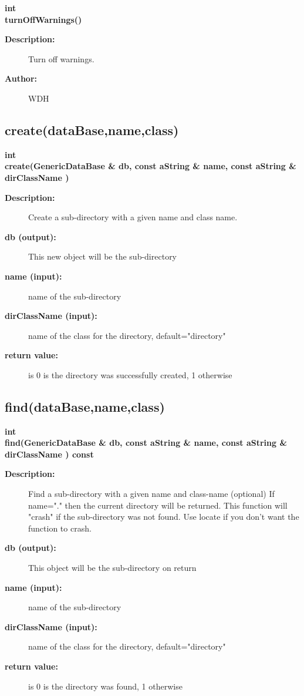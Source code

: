 \begin{flushleft} \textbf{%
int  \\ 
\settowidth{\GenericDataBaseIncludeArgIndent}{turnOffWarnings(}%
turnOffWarnings()
}\end{flushleft}
\begin{description}
\item[{\bf Description:}] 
   Turn off warnings.
\item[{\bf Author:}]  WDH

\end{description}
\subsection{create(dataBase,name,class)}
 
\begin{flushleft} \textbf{%
int  \\ 
\settowidth{\GenericDataBaseIncludeArgIndent}{create(}%
create(GenericDataBase \& db, const aString \& name, const aString \& dirClassName )
}\end{flushleft}
\begin{description}
\item[{\bf Description:}] 
   Create a sub-directory with a given name and class name.
\item[{\bf db (output):}]  This new object will be the sub-directory
\item[{\bf name (input):}]  name of the sub-directory
\item[{\bf dirClassName (input):}]  name of the class for the directory, default="directory"
\item[{\bf return value:}]  is 0 is the directory was successfully created, 1 otherwise

\end{description}
\subsection{find(dataBase,name,class) }
 
\begin{flushleft} \textbf{%
int  \\ 
\settowidth{\GenericDataBaseIncludeArgIndent}{find(}%
find(GenericDataBase \& db, const aString \& name, const aString \& dirClassName ) const
}\end{flushleft}
\begin{description}
\item[{\bf Description:}] 
   Find a sub-directory with a given name and class-name (optional)
   If name="." then the current directory will be returned.
   This function will "crash" if the sub-directory was not found. Use
   locate if you don't want the function to crash.
\item[{\bf db (output):}]  This object will be the sub-directory on return
\item[{\bf name (input):}]  name of the sub-directory
\item[{\bf dirClassName (input):}]  name of the class for the directory, default="directory"
\item[{\bf return value:}]  is 0 is the directory was found, 1 otherwise

\end{description}
